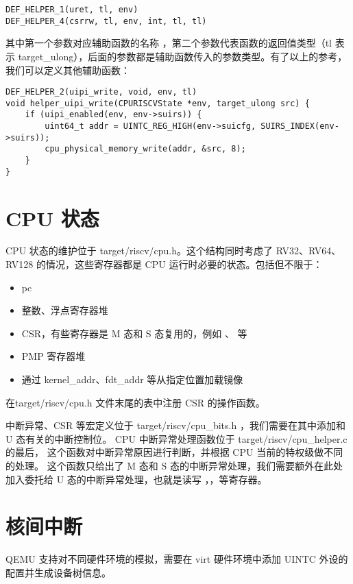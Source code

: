 \begin{lstlisting}[style=CStyle]
DEF_HELPER_1(uret, tl, env)
DEF_HELPER_4(csrrw, tl, env, int, tl, tl)
\end{lstlisting}

其中第一个参数对应辅助函数的名称 ，第二个参数代表函数的返回值类型（tl 表示 target\_ulong），后面的参数都是辅助函数传入的参数类型。有了以上的参考，我们可以定义其他辅助函数：

\begin{lstlisting}[style=CStyle]
DEF_HELPER_2(uipi_write, void, env, tl)
void helper_uipi_write(CPURISCVState *env, target_ulong src) {
    if (uipi_enabled(env, env->suirs)) {
        uint64_t addr = UINTC_REG_HIGH(env->suicfg, SUIRS_INDEX(env->suirs));
        cpu_physical_memory_write(addr, &src, 8);
    }
}
\end{lstlisting}

\section{CPU 状态}

CPU 状态的维护位于 target/riscv/cpu.h。这个结构同时考虑了 RV32、RV64、RV128 的情况，这些寄存器都是 CPU 运行时必要的状态。包括但不限于：

\begin{itemize}
    \item pc
    \item 整数、浮点寄存器堆
    \item CSR，有些寄存器是 M 态和 S 态复用的，例如 \Rmstatus、 \Rmip 等
    \item PMP 寄存器堆
    \item 通过 kernel\_addr、fdt\_addr 等从指定位置加载镜像
\end{itemize}

在target/riscv/cpu.h 文件末尾的表中注册 CSR 的操作函数。

中断异常、CSR 等宏定义位于 target/riscv/cpu\_bits.h ，我们需要在其中添加和 U 态有关的中断控制位。
CPU 中断异常处理函数位于 target/riscv/cpu\_helper.c 的最后，
这个函数对中断异常原因进行判断，并根据 CPU 当前的特权级做不同的处理。
这个函数只给出了 M 态和 S 态的中断异常处理，我们需要额外在此处加入委托给 U 态的中断异常处理，也就是读写 \Rustatus，\Rucause，\Ruepc 等寄存器。

\section{核间中断}

QEMU 支持对不同硬件环境的模拟，需要在 virt 硬件环境中添加 UINTC 外设的配置并生成设备树信息。

